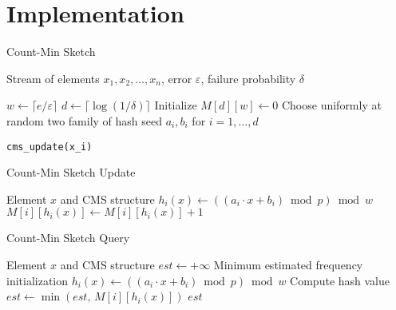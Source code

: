 \section{Implementation}

\begin{algorithm}[H]
\caption{Count-Min Sketch}
\begin{algorithmic}[1]
\Require Stream of elements $x_1, x_2, \dots, x_n$, error $\varepsilon$, failure probability $\delta$

\State $w \gets \lceil e / \varepsilon \rceil$ 
\State $d \gets \lceil \log(1/\delta) \rceil$ 
\State Initialize $M[d][w] \gets 0$ 
\State Choose uniformly at random two family of hash seed $a_i, b_i$ for $i = 1, \dots, d$

    \State \texttt{cms\_update(x\_i)}
\EndFor
\end{algorithmic}


\end{algorithm}
\begin{algorithm}[H]
\caption{Count-Min Sketch Update}
\begin{algorithmic}[1]
\Require Element $x$ and CMS structure 
    \State $h_i(x) \gets ((a_i \cdot x + b_i) \bmod p) \bmod w$ 
    \State $M[i][h_i(x)] \gets M[i][h_i(x)] + 1$
\EndFor
\end{algorithmic}
\end{algorithm}

\begin{algorithm}[H]
\caption{Count-Min Sketch Query}
\begin{algorithmic}[1]
    \Require Element $x$ and CMS structure
    \State $est \gets +\infty$  \Comment Minimum estimated frequency initialization
        \State $h_i(x) \gets ((a_i \cdot x + b_i) \bmod p) \bmod w$ \Comment Compute hash value
        \State $est \gets \min(est,\, M[i][h_i(x)])$
    \EndFor
    \State \Return $est$
\end{algorithmic}
\end{algorithm}
